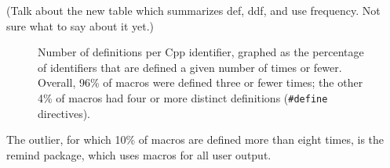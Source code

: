 \documentclass[10pt]{article}
\newcommand{\pkg}[1]{\textsf{#1}}
\begin{document}
        (Talk about the new table which summarizes def, ddf, and use
          frequency.  Not sure what to say about it yet.)

        \label{sec:usage}



        \begin{figure}
        \centerline{}
        \caption{Number of definitions per Cpp identifier, graphed as
          the percentage of identifiers that are defined a given number of times
          or fewer.  Overall, 96\% of macros were defined three or
          fewer times; the other 4\% of macros had four or more distinct
          definitions ({\tt \#define} directives).}
        \label{fig:freq-def-cat}
        \end{figure}

The outlier, for which 10\% of
macros are defined more than eight times, is the \pkg{remind}
package, which uses macros for all user output.


\end{document}
